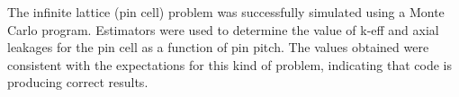 
The infinite lattice (pin cell) problem was successfully simulated using a Monte Carlo program.  Estimators were used to determine the value of k-eff and axial leakages for the pin cell as a function of pin pitch.  The values obtained were consistent with the expectations for this kind of problem, indicating that code is producing correct results.